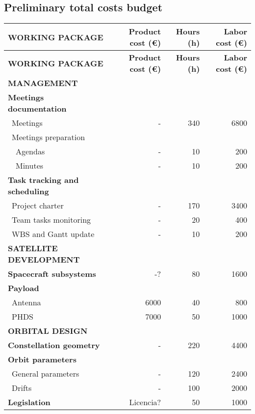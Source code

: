 \pagebreak

\subsection{Preliminary total costs budget}
\begin{longtable}{| l | r | r |r | }
	\hline
\rowcolor[gray]{0.65}	\textbf{WORKING PACKAGE} &\textbf{Product cost (\euro)}& \textbf{Hours (h)}     &  \textbf{Labor cost (\euro)}   \\
    \hline
    \endfirsthead

	\hline
\rowcolor[gray]{0.65}	\textbf{WORKING PACKAGE} &\textbf{Product cost (\euro)}& \textbf{Hours (h)}     &  \textbf{Labor cost (\euro)}   \\
    \hline
    \endhead

\rowcolor[gray]{0.85} \textbf{MANAGEMENT} & &  &  \\

   \textbf{Meetings documentation} & & & \\
	   \blue ~Meetings & - & 340  & 6800  \\
	   \blue ~Meetings preparation & & &   \\
	   ~~Agendas & - & 10 & 200 \\
	   ~~Minutes & - & 10 & 200 \\
	\hline
	\textbf{Task tracking and scheduling} & & & \\
	   \blue ~Project charter & - & 170 & 3400  \\
	   \blue ~Team tasks monitoring & - & 20 & 400  \\
	   \blue ~WBS and Gantt update & - & 10 & 200 \\

\rowcolor[gray]{0.85}	\textbf{SATELLITE DEVELOPMENT} & &  &   \\
	
	\textbf{Spacecraft subsystems} & -? & 80 & 1600  \\
	\hline
	\textbf{Payload} & & &  \\
	   \blue ~Antenna & 6000 & 40  & 800  \\
	   \blue ~PHDS & 7000 & 50  & 1000  \\

\rowcolor[gray]{0.85}	\textbf{ORBITAL DESIGN} & &  & \\

	\textbf{Constellation geometry} & - & 220  & 4400  \\
	\hline
	\textbf{Orbit parameters} & &   &  \\
	   \blue ~General parameters & - & 120 & 2400 \\
	   \blue ~Drifts & - & 100  & 2000  \\
	\hline
	\textbf{Legislation} & Licencia? & 50 & 1000 \\
   

\end{longtable}
